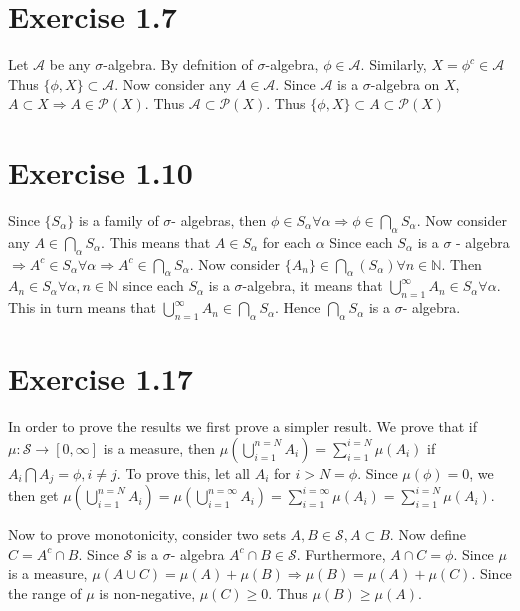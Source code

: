 \documentclass{article}
\begin{document}
  \section*{Exercise 1.7}
    Let $\mathcal{A}$ be any $\sigma$-algebra. By defnition of $\sigma$-algebra, $\phi \in \mathcal{A}$. Similarly, $X = {\phi}^c \in \mathcal{A}$
    Thus $\{\phi, X\} \subset \mathcal{A}$. Now consider any $A \in \mathcal{A}$. Since $\mathcal{A}$ is a $\sigma$-algebra on $X$, $A \subset X \Rightarrow
    A \in \mathcal{P}(X)$. Thus $\mathcal{A} \subset \mathcal{P}(X)$. Thus $\{\phi, X\} \subset A \subset \mathcal{P}(X)$

  \section*{Exercise 1.10}
    Since $\{S_\alpha\}$ is a family of $\sigma$- algebras, then $\phi \in S_\alpha \forall \alpha \Rightarrow \phi \in
    \bigcap_{\alpha}S_\alpha$. Now consider any $A \in  \bigcap_{\alpha}S_\alpha$. This means that $A \in S_\alpha$ for each $\alpha$
    Since each $S_\alpha$ is a $\sigma$ - algebra $\Rightarrow A^c \in S_\alpha \forall \alpha \Rightarrow A^c \in \bigcap_{\alpha}S_\alpha$.
    Now consider $\{A_n\} \in \bigcap_{\alpha}(S_\alpha) \forall n \in \mathbb{N}$. Then $A_n \in S_\alpha \forall \alpha, n \in \mathbb{N}$
    since each $S_\alpha$ is a $\sigma$-algebra, it means that $\bigcup_{n=1}^{\infty}A_n \in S_\alpha \forall \alpha$. This in turn means that
    $\bigcup_{n=1}^{\infty}A_n \in \bigcap_{\alpha}S_\alpha$. Hence $\bigcap_{\alpha}S_\alpha$ is a $\sigma$- algebra.

  \section*{Exercise 1.17}
    In order to prove the results we first prove a simpler result. We prove that if $\mu: \mathcal{S} \rightarrow [0, \infty]$ is a measure, then
    $\mu(\bigcup_{i=1}^{n=N}A_i) = \sum_{i=1}^{i=N}\mu(A_i)$ if $A_i \bigcap A_j = \phi, i \ne j$. To prove this, let all $A_i$ for $i > N = \phi$.
    Since $\mu(\phi)= 0$, we then get $\mu(\bigcup_{i=1}^{n=N}A_i) = \mu(\bigcup_{i=1}^{n=\infty}A_i) = \sum_{i=1}^{i=\infty}\mu(A_i) = \sum_{i=1}^{i=N}\mu(A_i)$.

    Now to prove monotonicity, consider two sets $A, B \in \mathcal{S}, A \subset B$. Now define $C = A^c \cap B$. Since $\mathcal{S}$ is a $\sigma$- algebra
    $A^c \cap B \in \mathcal{S}$. Furthermore, $A \cap C = \phi$. Since $\mu$ is a measure, $\mu(A \cup C) = \mu(A) + \mu(B) \Rightarrow
    \mu(B) = \mu(A) + \mu(C)$. Since the range of $\mu$ is non-negative, $\mu(C) \ge 0$. Thus $\mu(B) \ge \mu(A)$.
\end{document}
